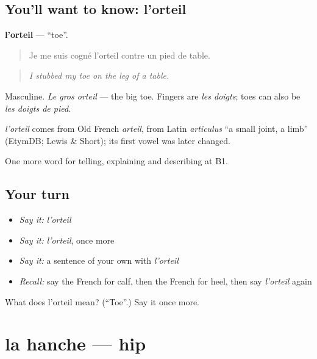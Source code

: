 \subsection*{You'll want to know: l'orteil}
\textbf{l'orteil} — \textquotedblleft{}toe\textquotedblright{}.

\begin{quote}
Je me suis cogné l'orteil contre un pied de table.
\end{quote}

\begin{quote}
\emph{I stubbed my toe on the leg of a table.}
\end{quote}

Masculine. \emph{Le gros orteil} — the big toe. Fingers are \emph{les doigts}; toes can also be \emph{les doigts de pied}.

\begin{cousinweb}
\emph{l'orteil} comes from Old French \emph{arteil}, from Latin \emph{articulus} \textquotedblleft{}a small joint, a limb\textquotedblright{} (EtymDB; Lewis \& Short); its first vowel was later changed.
\end{cousinweb}

\begin{grammarlens}[title={What you've built}]
One more word for telling, explaining and describing at B1.
\end{grammarlens}

\subsection*{Your turn}
\begin{itemize}
\raggedright
  \item \emph{Say it:} \emph{l'orteil}
  \item \emph{Say it:} \emph{l'orteil}, once more
  \item \emph{Say it:} a sentence of your own with \emph{l'orteil}
  \item \emph{Recall:} say the French for calf, then the French for heel, then say \emph{l'orteil} again
\end{itemize}

\begin{tcolorbox}[breakable,colback=teal!4,colframe=teal!35!black,title={Before you move on}]
What does l'orteil mean? (\textquotedblleft{}Toe\textquotedblright{}.) Say it once more.
\end{tcolorbox}
\section[la hanche]{la hanche — hip}

